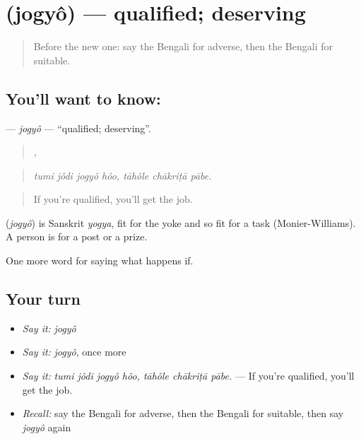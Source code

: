 \section[\texorpdfstring{\bn{যোগ্য} (jogyô)}{যোগ্য (jogyô)}]{ (jogyô) — qualified; deserving}

\label{lesson:BN-C380-jogyo}



\begin{quote}
Before the new one: say the Bengali for adverse, then the Bengali for suitable.
\end{quote}

\subsection*{You'll want to know: }
\textbf{} — \emph{jogyô} — \textquotedblleft{}qualified; deserving\textquotedblright{}.

\begin{quote}
   ,   
\end{quote}

\begin{quote}
\emph{tumi jôdi jogyô hôo, tāhôle chākriṭā pābe.}
\end{quote}

\begin{quote}
If you're qualified, you'll get the job.
\end{quote}

\begin{cousinweb}
\textbf{} (\emph{jogyô}) is Sanskrit \emph{yogya}, fit for the yoke and so fit for a task (Monier-Williams). A person is  for a post or a prize.
\end{cousinweb}

\begin{grammarlens}[title={What you've built}]
One more word for saying what happens if.
\end{grammarlens}

\subsection*{Your turn}
\begin{itemize}
\raggedright
  \item \emph{Say it:} \emph{jogyô}
  \item \emph{Say it:} \emph{jogyô}, once more
  \item \emph{Say it:} \emph{tumi jôdi jogyô hôo, tāhôle chākriṭā pābe.} — If you're qualified, you'll get the job.
  \item \emph{Recall:} say the Bengali for adverse, then the Bengali for suitable, then say \emph{jogyô} again
\end{itemize}

